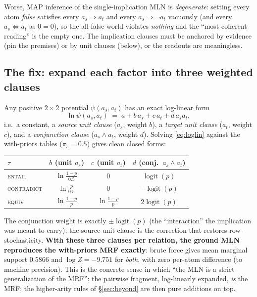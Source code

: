 \documentclass[11pt]{article}
\newcommand{\Ent}{\textsc{entail}}
\newcommand{\Con}{\textsc{contradict}}
\newcommand{\Equ}{\textsc{equiv}}
\begin{document}
Worse, MAP inference of the single-implication MLN is \emph{degenerate}: setting every atom
\emph{false} satisfies every $a_s\Rightarrow a_t$ and every $a_s\Rightarrow\neg a_t$
vacuously (and every $a_s\Leftrightarrow a_t$ as $0{=}0$), so the all-false world violates
\emph{nothing} and the ``most coherent reading'' is the empty one. The implication clauses
must be anchored by evidence (pin the premises) or by unit clauses (below), or the readouts
are meaningless.

\subsection{The fix: expand each factor into three weighted clauses}
Any positive $2\times2$ potential $\psi(a_s,a_t)$ has an exact log-linear form
\begin{equation}
  \ln\psi(a_s,a_t)\;=\;a + b\,a_s + c\,a_t + d\,a_s a_t ,
  \label{eq:loglin}
\end{equation}
i.e.\ a constant, a \emph{source unit clause} ($a_s$, weight $b$), a \emph{target unit
clause} ($a_t$, weight $c$), and a \emph{conjunction clause} ($a_s\wedge a_t$, weight $d$).
Solving \eqref{eq:loglin} against the with-priors tables ($\pi_s{=}0.5$) gives clean closed
forms:
\begin{center}\small
\renewcommand{\arraystretch}{1.25}
\begin{tabular}{@{}lccc@{}}
\toprule
$\tau$ & $b$ (unit $a_s$) & $c$ (unit $a_t$) & $d$ (conj.\ $a_s\wedge a_t$)\\
\midrule
\Ent{}  & $\ln\frac{1-p}{0.5}$ & $0$ & $\operatorname{logit}(p)$\\
\Con{}  & $\ln\frac{p}{0.5}$   & $0$ & $-\operatorname{logit}(p)$\\
\Equ{}  & $\ln\frac{1-p}{p}$   & $\ln\frac{1-p}{p}$ & $2\operatorname{logit}(p)$\\
\bottomrule
\end{tabular}
\end{center}
The conjunction weight is exactly $\pm\operatorname{logit}(p)$ (the ``interaction'' the
implication was meant to carry); the source unit clause is the correction that restores
row-stochasticity. \textbf{With these three clauses per relation, the ground MLN reproduces
the with-priors MRF exactly}: brute force gives mean marginal support $0.5866$ and
$\log Z=-9.751$ for \emph{both}, with zero per-atom difference (to machine precision).
This is the concrete sense in which ``the MLN is a strict generalization of the MRF'': the
pairwise fragment, log-linearly expanded, \emph{is} the MRF; the higher-arity rules of
\S\ref{sec:beyond} are then pure additions on top.
\end{document}
